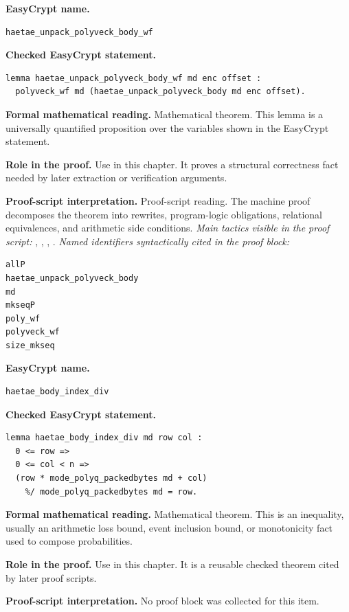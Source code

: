 \begin{formaltheorem}
\noindent\textbf{EasyCrypt name.}
\begin{lstlisting}[language=EasyCrypt,basicstyle=\ttfamily\scriptsize]
haetae_unpack_polyveck_body_wf
\end{lstlisting}
\noindent\textbf{Checked EasyCrypt statement.}
\begin{lstlisting}[language=EasyCrypt,basicstyle=\ttfamily\scriptsize]
lemma haetae_unpack_polyveck_body_wf md enc offset :
  polyveck_wf md (haetae_unpack_polyveck_body md enc offset).
\end{lstlisting}
\noindent\textbf{Formal mathematical reading.}
Mathematical theorem. This lemma is a universally quantified proposition over the variables shown in the EasyCrypt statement.

\noindent\textbf{Role in the proof.}
Use in this chapter. It proves a structural correctness fact needed by later extraction or verification arguments.

\noindent\textbf{Proof-script interpretation.}
Proof-script reading. The machine proof decomposes the theorem into rewrites, program-logic obligations, relational equivalences, and arithmetic side conditions.
\emph{Main tactics visible in the proof script:} , , , .
\emph{Named identifiers syntactically cited in the proof block:}
\begin{lstlisting}[language=EasyCrypt,basicstyle=\ttfamily\scriptsize]
allP
haetae_unpack_polyveck_body
md
mkseqP
poly_wf
polyveck_wf
size_mkseq
\end{lstlisting}

\end{formaltheorem}

\begin{formaltheorem}
\noindent\textbf{EasyCrypt name.}
\begin{lstlisting}[language=EasyCrypt,basicstyle=\ttfamily\scriptsize]
haetae_body_index_div
\end{lstlisting}
\noindent\textbf{Checked EasyCrypt statement.}
\begin{lstlisting}[language=EasyCrypt,basicstyle=\ttfamily\scriptsize]
lemma haetae_body_index_div md row col :
  0 <= row =>
  0 <= col < n =>
  (row * mode_polyq_packedbytes md + col)
    %/ mode_polyq_packedbytes md = row.
\end{lstlisting}
\noindent\textbf{Formal mathematical reading.}
Mathematical theorem. This is an inequality, usually an arithmetic loss bound, event inclusion bound, or monotonicity fact used to compose probabilities.

\noindent\textbf{Role in the proof.}
Use in this chapter. It is a reusable checked theorem cited by later proof scripts.

\noindent\textbf{Proof-script interpretation.}
No proof block was collected for this item.

\end{formaltheorem}

